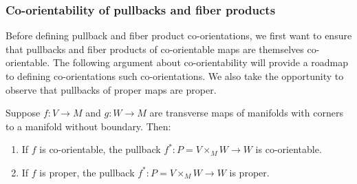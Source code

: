 \begin{comment}
	BCOMMENT
	\red{Again, isn't the point that we do not know $\gamma$, so how can we fix the diagram to commute and then use that to determine $\gamma$? I think the idea is that we really need to say that the first diagram somehow determines this diagram via some conventions (what are those?).
		Then we know what the maps on the right are because that's just the tensor product of co-orientations of $V$ and $W$.
		On the left we know $i$ since that's canonical somehow (we still need to look up a good reference for that), and then all these other things determine a unique $\gamma$ so that the diagram commutes.
		This $\gamma$ is our co-orientation for $P$.
		So I think this all needs to be clarified.}
	Any such set of choices then yields
	a definition of pullback co-orientation through a diagram chase.
	In concrete terms, fix a local orientation $\beta_M$ of $M$, and then
	use the co-orientations of $f$ and $g$ to identify compatible local orientations $\beta_V$ of $V$ and $\beta_W$ of $W$.
	A fixed identification
	of the normal bundle of $\Delta M$ with the tangent bundle of $M$ then gives a $\beta_{\nu P \subset V \times W}$ which corresponds to $\beta_M$.
	The pullback co-orientation of the map $P \to M$ can then be defined pair $\beta_M$ with a
	local orientation $\beta_P$ of $P$ so that $\beta_P \otimes \beta_{\nu P \subset V \times W}$ maps to $\beta_V \otimes \beta_W$ under
	the top horizontal isomorphism of Equation~\ref{co-or stuff}.
	ECOMMENT

	In order to obtain these properties we will develop additional structure to control the
	isomorphisms in Diagram~\eqref{co-or stuff}.
	We do this first by working at the level of vector spaces and linear maps over a point before expanding to local definitions and then
	back to the global level.
\end{comment}

\subsubsection{Co-orientability of pullbacks and fiber products}

Before defining pullback and fiber product co-orientations, we first want to ensure that pullbacks and fiber products of co-orientable maps are themselves co-orientable.
The following argument about co-orientability will provide a roadmap to defining co-orientations such co-orientations.
We also take the opportunity to observe that pullbacks of proper maps are proper.

\begin{lemma}\label{L: co-orientable pullback}
	Suppose $f \colon V \to M$ and $g \colon W \to M$ are transverse maps of manifolds with corners to a manifold without boundary.
	Then:
	\begin{enumerate}
		\item If $f$ is co-orientable, the pullback $f^* \colon P = V \times_M W \to W$ is co-orientable.
		\item If $f$ is proper, the pullback $f^* \colon P = V \times_M W \to W$ is proper.
	\end{enumerate}
\end{lemma}

